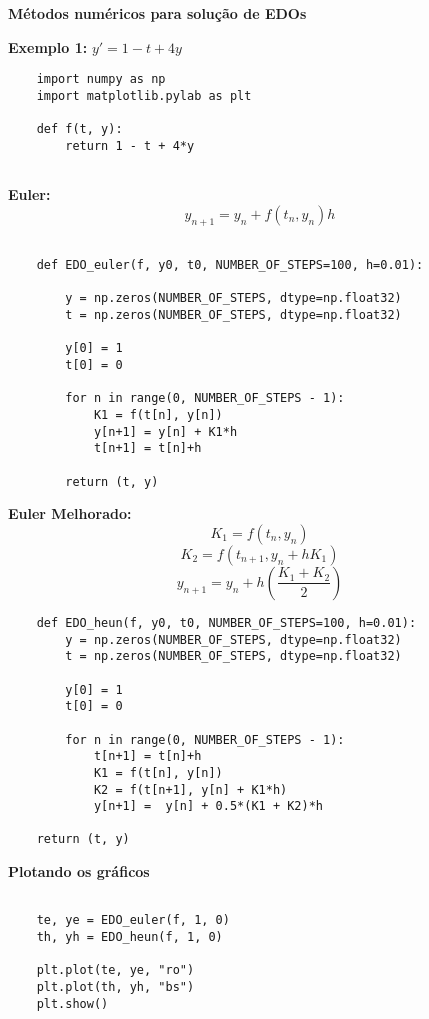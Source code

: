 \documentclass[a4paper,12pt]{article}
\begin{document}
\begin{center}
    \textbf{Métodos numéricos para solução de EDOs}
\end{center}

\textbf{Exemplo 1:} $y' = 1 - t + 4y$


\begin{lstlisting}
    import numpy as np
    import matplotlib.pylab as plt
    
    def f(t, y):
        return 1 - t + 4*y
    

\end{lstlisting}

\textbf{Euler:}
$$y_{n+1} = y_n + f(t_n,y_n)h$$
\begin{lstlisting}

    def EDO_euler(f, y0, t0, NUMBER_OF_STEPS=100, h=0.01):
    
        y = np.zeros(NUMBER_OF_STEPS, dtype=np.float32)
        t = np.zeros(NUMBER_OF_STEPS, dtype=np.float32)
    
        y[0] = 1
        t[0] = 0
    
        for n in range(0, NUMBER_OF_STEPS - 1):
            K1 = f(t[n], y[n])
            y[n+1] = y[n] + K1*h  
            t[n+1] = t[n]+h  
    
        return (t, y)

\end{lstlisting}

\textbf{Euler Melhorado:} 
$$K_1 = f(t_n,y_n)$$
$$K_2 = f(t_{n+1}, y_n + hK_1)$$
$$y_{n+1} = y_n + h(\frac{K_1 + K_2}{2})$$


\begin{lstlisting}
    def EDO_heun(f, y0, t0, NUMBER_OF_STEPS=100, h=0.01):
        y = np.zeros(NUMBER_OF_STEPS, dtype=np.float32)
        t = np.zeros(NUMBER_OF_STEPS, dtype=np.float32)

        y[0] = 1
        t[0] = 0

        for n in range(0, NUMBER_OF_STEPS - 1):
            t[n+1] = t[n]+h
            K1 = f(t[n], y[n])
            K2 = f(t[n+1], y[n] + K1*h)
            y[n+1] =  y[n] + 0.5*(K1 + K2)*h

    return (t, y)

\end{lstlisting}

\textbf{Plotando os gráficos}
\begin{lstlisting}

    te, ye = EDO_euler(f, 1, 0)
    th, yh = EDO_heun(f, 1, 0)

    plt.plot(te, ye, "ro")
    plt.plot(th, yh, "bs")
    plt.show()

\end{lstlisting}
\end{document}

